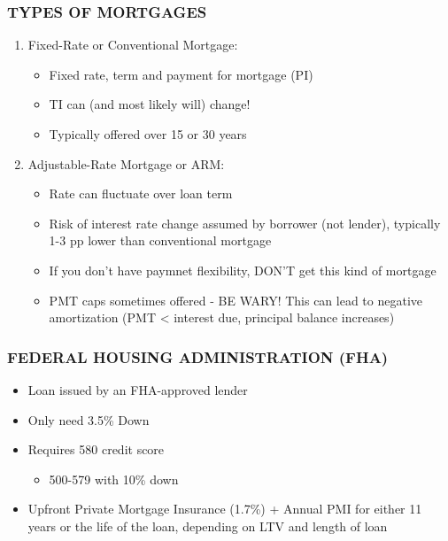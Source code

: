 \documentclass[12pt]{article}
\begin{document}
            \subsubsection{TYPES OF MORTGAGES}
                \begin{enumerate}
                    \item Fixed-Rate or Conventional Mortgage:
                        \begin{itemize}
                            \item Fixed rate, term and payment for mortgage (PI)
                            \item TI can (and most likely will) change!
                            \item Typically offered over 15 or 30 years
                        \end{itemize}
                    \item Adjustable-Rate Mortgage or ARM:
                        \begin{itemize}
                            \item Rate can fluctuate over loan term
                            \item Risk of interest rate change assumed by borrower (not lender), typically 1-3 pp lower than conventional mortgage
                            \item If you don't have paymnet flexibility, DON'T get this kind of mortgage
                            \item PMT caps sometimes offered - BE WARY! This can lead to negative amortization (PMT < interest due, principal balance increases)
                        \end{itemize}
                \end{enumerate}
            \subsubsection{FEDERAL HOUSING ADMINISTRATION (FHA)}
                \begin{itemize}
                    \item Loan issued by an FHA-approved lender
                    \item Only need 3.5\% Down
                    \item Requires 580 credit score
                        \begin{itemize}
                            \item 500-579 with 10\% down
                        \end{itemize}
                    \item Upfront Private Mortgage Insurance (1.7\%) + Annual PMI for either 11 years or the life of the loan,
                        depending on LTV and length of loan
                \end{itemize}
\end{document}

